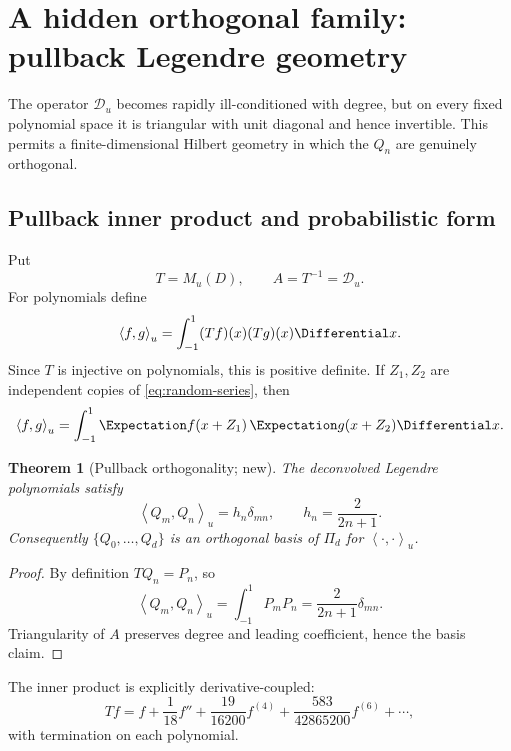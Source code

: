 \documentclass[11pt,oneside]{article}
\numberwithin{equation}{section}
\newtheorem{theorem}{Theorem}[section]
\theoremstyle{definition}
\theoremstyle{remark}
\newcommand{\M}{M_u}
\newcommand{\Dscr}{\mathscr D_u}
\newcommand{\inner}[2]{\left\langle #1,#2\right\rangle}
\begin{document}
\section{A hidden orthogonal family: pullback Legendre geometry}
\label{sec:pullback}

The operator $\Dscr$ becomes rapidly ill-conditioned with degree, but on every
fixed polynomial space it is triangular with unit diagonal and hence
invertible.  This permits a finite-dimensional Hilbert geometry in which the
$Q_n$ are genuinely orthogonal.

\subsection{Pullback inner product and probabilistic form}

Put
\begin{equation}
 T=\M(D),\qquad A=T^{-1}=\Dscr.
 \label{eq:T-A}
\end{equation}
For polynomials define
\begin{equation}
 \inner{f}{g}_u=\int_{-1}^{1}(Tf)(x)(Tg)(x)\Differential x.
 \label{eq:pullback-inner}
\end{equation}
Since $T$ is injective on polynomials, this is positive definite.  If $Z_1,Z_2$
are independent copies of \eqref{eq:random-series}, then
\begin{equation}
 \inner{f}{g}_u
 =\int_{-1}^{1}\Expectation f(x+Z_1)\,\Expectation g(x+Z_2)\Differential x.
 \label{eq:pullback-probabilistic}
\end{equation}

\begin{theorem}[Pullback orthogonality; new]
\label{thm:pullback-orthogonality}
The deconvolved Legendre polynomials satisfy
\begin{equation}
 \boxed{
 \inner{Q_m}{Q_n}_u=h_n\delta_{mn},\qquad
 h_n=\frac{2}{2n+1}.}
 \label{eq:Q-orthogonality}
\end{equation}
Consequently $\{Q_0,\ldots,Q_d\}$ is an orthogonal basis of $\Pi_d$ for
$\inner{\cdot}{\cdot}_u$.
\end{theorem}

\begin{proof}
By definition $TQ_n=P_n$, so
\[
 \inner{Q_m}{Q_n}_u=\int_{-1}^{1}P_mP_n
 =\frac{2}{2n+1}\delta_{mn}.
\]
Triangularity of $A$ preserves degree and leading coefficient, hence the basis
claim.
\end{proof}

The inner product is explicitly derivative-coupled:
\begin{equation}
 Tf=f+\frac1{18}f''+\frac{19}{16200}f^{(4)}
 +\frac{583}{42865200}f^{(6)}+\cdots,
 \label{eq:T-expansion}
\end{equation}
with termination on each polynomial.
\end{document}
